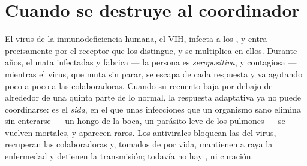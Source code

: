 \section{Cuando se destruye al coordinador}

\begin{proposition}\label{prop:g12:adaptive-immunity:hiv}
El virus de la inmunodeficiencia humana, el VIH, infecta a los
, y entra precisamente por el receptor que
los distingue, y se multiplica en ellos. Durante años, el  mata  infectadas y fabrica  --- la
persona es \emph{seropositiva}, y contagiosa --- mientras el virus,
que muta sin parar, se escapa de cada respuesta y va agotando poco a
poco a las  colaboradoras. Cuando su recuento baja por debajo de
alrededor de una quinta parte de lo normal, la respuesta adaptativa ya
no puede coordinarse: es el \emph{sida}, en el que unas
infecciones que un organismo sano elimina sin enterarse --- un hongo de
la boca, un parásito leve de los pulmones --- se vuelven mortales, y
aparecen  raros. Los antivirales bloquean las  del
virus, recuperan las  colaboradoras y, tomados de por vida,
mantienen a raya la enfermedad y detienen la transmisión; todavía no
hay , ni curación.
\end{proposition}
\admitted

